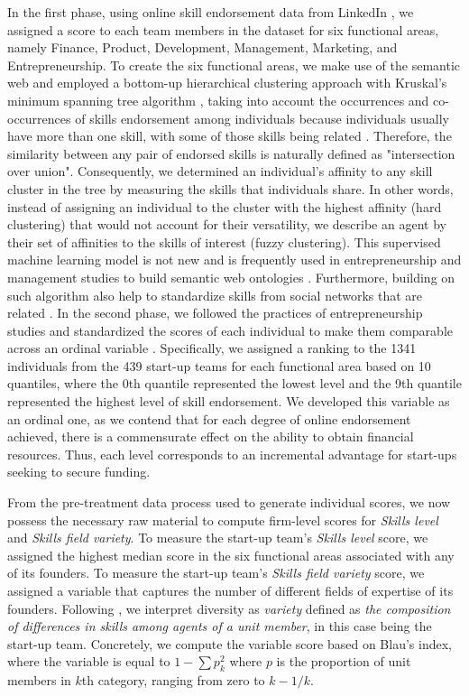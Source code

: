 \documentclass[12pt]{article}
\begin{document}
In the first phase, using online skill endorsement data from LinkedIn \citep{rapanta2017linkedin}, we assigned a score to each team members in the dataset for six functional areas, namely Finance, Product, Development, Management, Marketing, and Entrepreneurship. To create the six functional areas, we make use of the semantic web and employed a bottom-up hierarchical clustering approach with Kruskal's minimum spanning tree algorithm \citep{kruskal1956shortest}, taking into account the occurrences and co-occurrences of skills endorsement among individuals because individuals usually have more than one skill, with some of those skills being related \citep{perez2016endorsement}. Therefore, the similarity between any pair of endorsed skills is naturally defined as "intersection over union". Consequently, we determined an individual's affinity to any skill cluster in the tree by measuring the skills that individuals share. In other words, instead of assigning an individual to the cluster with the highest affinity (hard clustering) that would not account for their versatility, we describe an agent by their set of affinities to the skills of interest (fuzzy clustering). This supervised machine learning model is not new and is frequently used in entrepreneurship and management studies to build semantic web ontologies \citep{kaushal2021artificial, ponte2022use}. Furthermore, building on such algorithm also help to standardize skills from social networks that are related  \citep{perez2016endorsement}. In the second phase, we followed the practices of entrepreneurship studies and standardized the scores of each individual to make them comparable across an ordinal variable \citep{harrison2007s}. Specifically, we assigned a ranking to the 1341 individuals from the 439 start-up teams for each functional area based on 10 quantiles, where the 0th quantile represented the lowest level and the 9th quantile represented the highest level of skill endorsement. We developed this variable as an ordinal one, as we contend that for each degree of online endorsement achieved, there is a commensurate effect on the ability to obtain financial resources. Thus, each level corresponds to an incremental advantage for start-ups seeking to secure funding.

From the pre-treatment data process used to generate individual scores, we now possess the necessary raw material to compute firm-level scores for \textit{Skills level} and \textit{Skills field variety}. To measure the start-up team's \textit{Skills level} score, we assigned the highest median score in the six functional areas associated with any of its founders. To measure the start-up team's \textit{Skills field variety} score, we assigned a variable that captures the number of different fields of expertise of its founders. Following \citet{harrison2007s}, we interpret diversity as \textit{variety} defined as \textit{the composition of differences in skills among agents of a unit member}, in this case being the start-up team. Concretely, we compute the variable score based on Blau's index, where the variable is equal to $1-\sum p_k^2$ where $p$ is the proportion of unit members in $k$th category, ranging from zero to $k-1/k$.
\end{document}

